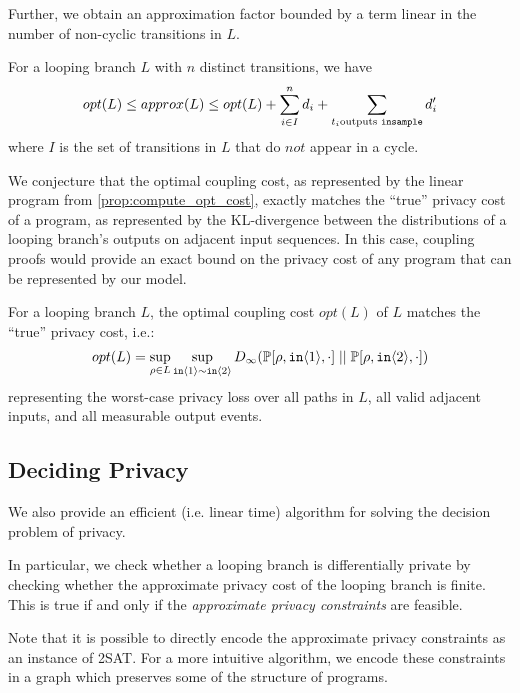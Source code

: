 Further, we obtain an approximation factor bounded by a term linear in the number of non-cyclic transitions in $L$. 

\begin{prop}
    \label{prop:approx_opt_are_close}
    For a looping branch $L$ with $n$ distinct transitions, we have 
    \[opt(L) \leq approx(L) \leq opt(L) + \sum_{i \in I }^n d_i + \sum_{t_i \text{outputs \texttt{insample}}} d_i'\]
    where $I$ is the set of transitions in $L$ that do $\textit{not}$ appear in a cycle.
\end{prop}

We conjecture that the optimal coupling cost, as represented by the linear program from \ref{prop:compute_opt_cost}, exactly matches the ``true'' privacy cost of a program, as represented by the KL-divergence between the distributions of a looping branch's outputs on adjacent input sequences. In this case, coupling proofs would provide an exact bound on the privacy cost of any program that can be represented by our model. 

\begin{conj}
    For a looping branch $L$, the optimal coupling cost $opt(L)$ of $L$ matches the ``true'' privacy cost, i.e.:
    \begin{align*}
        opt(L) = \sup_{\rho \in L} \sup_{\texttt{in}\langle1 \rangle \sim \texttt{in}\langle2 \rangle} D_\infty(\mathbb{P}[\rho, \texttt{in}\langle1 \rangle, \cdot]\; ||\; \mathbb{P}[\rho, \texttt{in}\langle2 \rangle, \cdot])
    \end{align*}
    representing the worst-case privacy loss over all paths in $L$, all valid adjacent inputs, and all measurable output events.
\end{conj}

\subsection{Deciding Privacy}

We also provide an efficient (i.e. linear time) algorithm for solving the decision problem of privacy.

In particular, we check whether a looping branch is differentially private by checking whether the approximate privacy cost of the looping branch is finite. This is true if and only if the \textit{approximate privacy constraints} are feasible.

Note that it is possible to directly encode the approximate privacy constraints as an instance of 2SAT. For a more intuitive algorithm, we encode these constraints in a graph which preserves some of the structure of programs. 

